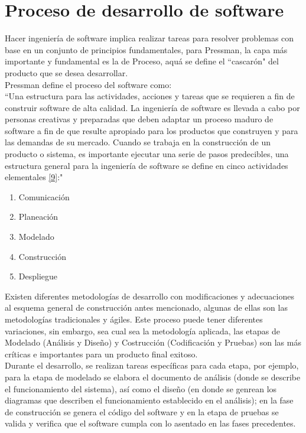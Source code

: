 \section{Proceso de desarrollo de software}

Hacer ingeniería de software implica realizar tareas para resolver problemas con base en un conjunto de principios fundamentales, para Pressman, la capa más importante y fundamental es la de Proceso, aquá se define el ``cascarón" del producto que se desea desarrollar.\\

Pressman define el proceso del software como: \\

``Una estructura para las actividades, acciones y tareas que se requieren a fin de construir software de alta calidad. La ingeniería de software es llevada a cabo por personas creativas y preparadas que deben adaptar un proceso maduro de software a fin de que resulte apropiado para los productos que construyen y para las demandas de su mercado.
Cuando se trabaja en la construcción de un producto o sistema, es importante ejecutar una serie de pasos predecibles, una estructura general para la ingeniería de software se define en cinco actividades elementales  \hyperlink{b09}{[9]}:"

\begin{enumerate}
	\item Comunicación
	\item Planeación
	\item Modelado
	\item Construcción
	\item Despliegue
\end{enumerate}

Existen diferentes metodologías de desarrollo con modificaciones y adecuaciones al esquema general de construcción antes mencionado, algunas de ellas son las metodologías tradicionales y ágiles. Este proceso puede tener diferentes variaciones, sin embargo, sea cual sea la metodología aplicada, las etapas de Modelado (Análisis y Diseño) y Costrucción (Codificación y Pruebas) son las más críticas e importantes para un producto final exitoso.\\

Durante el desarrollo, se realizan tareas específicas para cada etapa, por ejemplo, para la etapa de modelado se elabora el documento de análisis (donde se describe el funcionamiento del sistema), así como el diseño (en donde se genrean los diagramas que describen el funcionamiento establecido en el análisis); en la fase de construcción se genera el código del software y en la etapa de pruebas se valida y verifica que el software cumpla con lo asentado en las fases precedentes.

